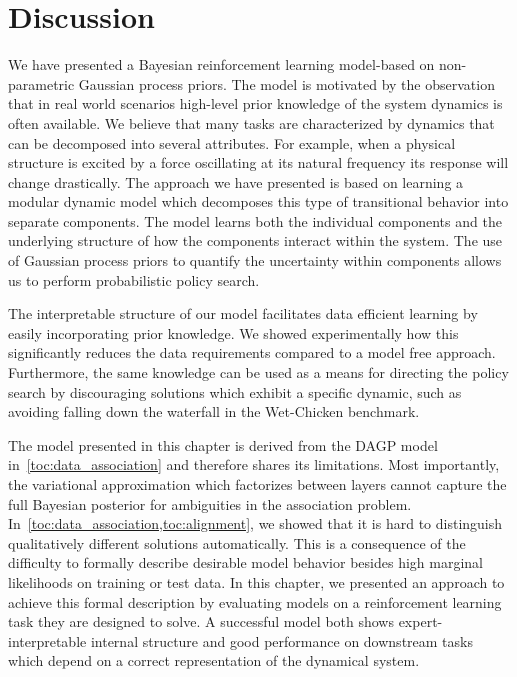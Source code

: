 \section{Discussion}
\label{toc:interpretable_rl:conclusion}
We have presented a Bayesian reinforcement learning model-based on non-parametric Gaussian process priors.
The model is motivated by the observation that in real world scenarios high-level prior knowledge of the system dynamics is often available.
We believe that many tasks are characterized by dynamics that can be decomposed into several attributes.
For example, when a physical structure is excited by a force oscillating at its natural frequency its response will change drastically.
The approach we have presented is based on learning a modular dynamic model which decomposes this type of transitional behavior into separate components.
The model learns both the individual components and the underlying structure of how the components interact within the system.
The use of Gaussian process priors to quantify the uncertainty within components allows us to perform probabilistic policy search.

The interpretable structure of our model facilitates data efficient learning by easily incorporating prior knowledge.
We showed experimentally how this significantly reduces the data requirements compared to a model free approach.
Furthermore, the same knowledge can be used as a means for directing the policy search by discouraging solutions which exhibit a specific dynamic, such as avoiding falling down the waterfall in the Wet-Chicken benchmark.

The model presented in this chapter is derived from the DAGP model in~\cref{toc:data_association} and therefore shares its limitations.
Most importantly, the variational approximation which factorizes between layers cannot capture the full Bayesian posterior for ambiguities in the association problem.
In~\cref{toc:data_association,toc:alignment}, we showed that it is hard to distinguish qualitatively different solutions automatically.
This is a consequence of the difficulty to formally describe desirable model behavior besides high marginal likelihoods on training or test data.
In this chapter, we presented an approach to achieve this formal description by evaluating models on a reinforcement learning task they are designed to solve.
A successful model both shows expert-interpretable internal structure and good performance on downstream tasks which depend on a correct representation of the dynamical system.
